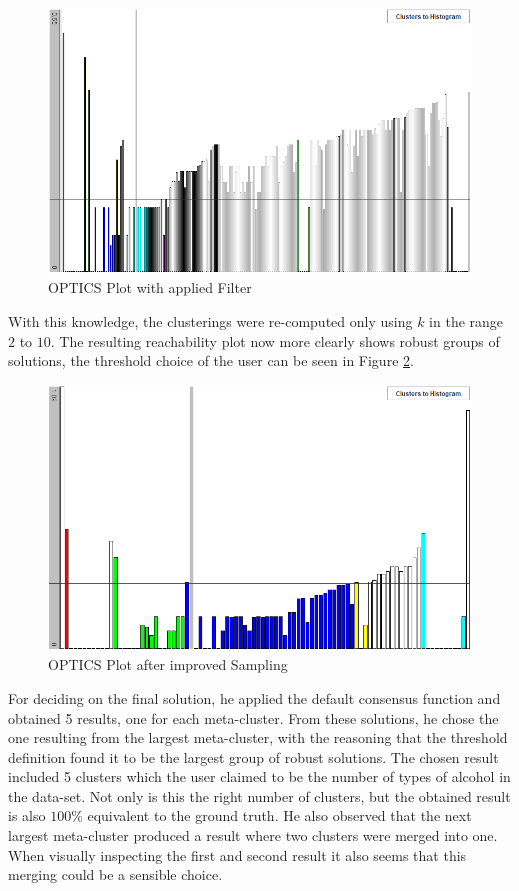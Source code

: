 \documentclass[
	a4paper,
	english,
	twoside,
	openright,               
	11pt                            
	]{report}
\begin{document}
\begin{figure}[h]
	\centering
	\includegraphics[scale=.6]{user_qcm_optics}
	\caption{OPTICS Plot with applied Filter}
	\label{fig:user_qcm_optics}
\end{figure}

With this knowledge, the clusterings were re-computed only using $k$ in the range $2$ to $10$. The resulting reachability plot now more clearly shows robust groups of solutions, the threshold choice of the user can be seen in Figure \ref{fig:user_qcm_optics2}.

\begin{figure}[H]
	\centering
	\includegraphics[scale=.6]{user_qcm_optics2}
	\caption{OPTICS Plot after improved Sampling}
	\label{fig:user_qcm_optics2}
\end{figure}

For deciding on the final solution, he applied the default consensus function and obtained 5 results, one for each meta-cluster. From these solutions, he chose the one resulting from the largest meta-cluster, with the reasoning that the threshold definition found it to be the largest group of robust solutions. The chosen result included 5 clusters which the user claimed to be the number of types of alcohol in the data-set. Not only is this the right number of clusters, but the obtained result is also $100\% $ equivalent to the ground truth. He also observed that the next largest meta-cluster produced a result where two clusters were merged into one. When visually inspecting the first and second result it also seems that this merging could be a sensible choice.
\end{document}
